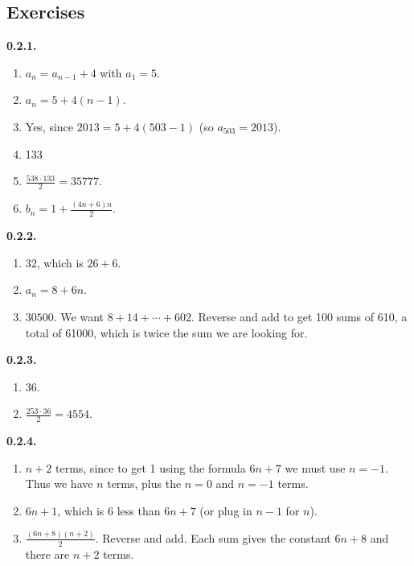 \documentclass[12pt,]{book}
\theoremstyle{plain}
\theoremstyle{definition}
\theoremstyle{definition}
\theoremstyle{definition}
\numberwithin{equation}{chapter}
\begin{document}
\subsection*{ Exercises}
\noindent\textbf{0.2.1.} \hypertarget{p-177}{}%
\leavevmode%
\begin{enumerate}[label=(\alph*)]
\item\hypertarget{li-99}{}\(a_n = a_{n-1} + 4\) with \(a_1 = 5\).%
\item\hypertarget{li-100}{}\(a_n = 5 + 4(n-1)\).%
\item\hypertarget{li-101}{}\hypertarget{p-178}{}%
Yes, since \(2013 = 5 + 4(503-1)\) (so \(a_{503} = 2013\)).%
\item\hypertarget{li-102}{}\hypertarget{p-179}{}%
133%
\item\hypertarget{li-103}{}\(\frac{538\cdot 133}{2} = 35777\).%
\item\hypertarget{li-104}{}\(b_n = 1 + \frac{(4n+6)n}{2}\).%
\end{enumerate}
%
\par\smallskip
\noindent\textbf{0.2.2.} \hypertarget{p-185}{}%
\leavevmode%
\begin{enumerate}[label=(\alph*)]
\item\hypertarget{li-108}{}\hypertarget{p-186}{}%
\(32\), which is \(26+6\).%
\item\hypertarget{li-109}{}\(a_n = 8 + 6n\).%
\item\hypertarget{li-110}{}\(30500\).  We want \(8 + 14 + \cdots + 602\).  Reverse and add to get 100 sums of 610, a total of 61000, which is twice the sum we are looking for.%
\end{enumerate}
%
\par\smallskip
\noindent\textbf{0.2.3.} \hypertarget{p-191}{}%
\leavevmode%
\begin{enumerate}[label=(\alph*)]
\item\hypertarget{li-113}{}\hypertarget{p-192}{}%
36.%
\item\hypertarget{li-114}{}\(\frac{253 \cdot 36}{2} = 4554\).%
\end{enumerate}
%
\par\smallskip
\noindent\textbf{0.2.4.} \hypertarget{p-198}{}%
\leavevmode%
\begin{enumerate}[label=(\alph*)]
\item\hypertarget{li-118}{}\(n+2\) terms, since to get 1 using the formula \(6n+7\) we must use \(n=-1\).  Thus we have \(n\) terms, plus the \(n=0\) and \(n=-1\) terms.%
\item\hypertarget{li-119}{}\(6n+1\), which is 6 less than \(6n+7\) (or plug in \(n-1\) for \(n\)).%
\item\hypertarget{li-120}{}\(\frac{(6n+8)(n+2)}{2}\).  Reverse and add.  Each sum gives the constant \(6n+8\) and there are \(n+2\) terms.%
\end{enumerate}
\end{document}
